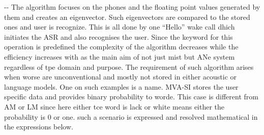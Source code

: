 \documentclass[12pt]{article}
\makeatletter
\newenvironment{indentation}[3]%
	{\par\setlength{\parindent}{#3}
	\setlength{\leftmargin}{#1}       \setlength{\rightmargin}{#2}%
	\advance\linewidth -\leftmargin       \advance\linewidth -\rightmargin%
	\advance\@totalleftmargin\leftmargin  \@setpar{{\@@par}}%
	\parshape 1\@totalleftmargin \linewidth\ignorespaces}{\par}%
\makeatother
\begin{document}
\begin{indentation}{0pt}{0pt}{0pt}
The algorithm focuses on the phones and the floating point values generated by
them and creates an eigenvector. Such eigenvectors are compared to the stored
ones and user is recognize. This is all done by one ``Hello'' wake call dhich
initiates the ASR and also recognises the user. Since the keyword for this
operation is predefined the complexity of the algorithm decreases while the
efficiency increases with as the main aim of not just mist but ANe system
regardless of tpe domain and purpose. The requirement of such algorithm arises
when worse are unconventional and mostly not stored in either acoustic or
language models. One on such examples is a name. MVA-SI stores the user specific
data and provides binary probability to worde. This case is different from AM or
LM since here either tce word is lack or white means either the probability is 0
or one. such a scenario is expressed and resolved mathematical in the
expressions below.
\end{indentation}
\end{document}
